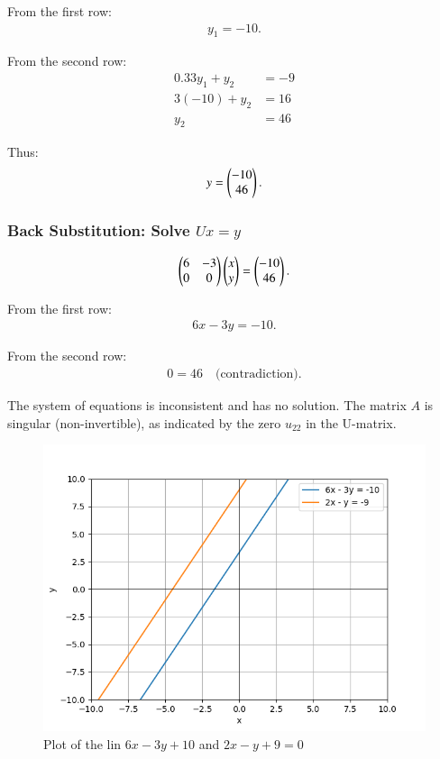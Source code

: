 \documentclass[journal]{IEEEtran}
\begin{document}
From the first row:
\begin{align}
y_1 = -10.
\end{align}

From the second row:
\begin{align}
0.33y_1 + y_2 &= -9 \\
3(-10) + y_2 &= 16 \\
y_2 &= 46
\end{align}

Thus:
\begin{align}
{y} = \begin{pmatrix}-10 \\ 46\end{pmatrix}.
\end{align}

\subsubsection*{Back Substitution: Solve $Ux = y$ }
\begin{align}
\begin{pmatrix}6 & -3 \\ 0 & 0\end{pmatrix}
\begin{pmatrix}x \\ y\end{pmatrix}
=
\begin{pmatrix}-10 \\ 46\end{pmatrix}.
\end{align}

From the first row:
\begin{align}
6x - 3y = -10.
\end{align}

From the second row:
\begin{align}
0 = 46 \quad \text{(contradiction)}.
\end{align}

The system of equations is inconsistent and has no solution. The matrix $A$ is singular (non-invertible), as indicated by the zero $u_{22}$ in the U-matrix.

\begin{figure}[H]
    \centering
    \includegraphics[width=\columnwidth]{figs/fig.png}
	\caption{Plot of the lin $6x - 3y+10$ and $2x-y+9=0$}
 \end{figure}
\end{document}

